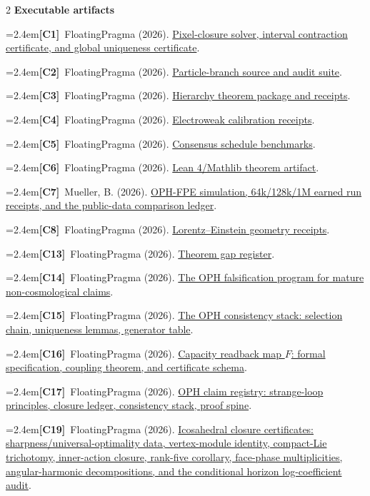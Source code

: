 \documentclass[10pt]{article}
\newcommand{\refentry}[2]{\par\noindent\hangindent=2.4em\hangafter=1\textbf{#1}\ #2}
\begin{document}
{\begin{multicols}{2}
\textbf{Executable artifacts}
\refentry{[C1]}{FloatingPragma (2026). \href{https://github.com/FloatingPragma/observer-patch-holography/tree/main/code/P_derivation}{Pixel-closure solver, interval contraction certificate, and global uniqueness certificate}.}
\refentry{[C2]}{FloatingPragma (2026). \href{https://github.com/FloatingPragma/observer-patch-holography/tree/main/code/particles}{Particle-branch source and audit suite}.}
\refentry{[C3]}{FloatingPragma (2026). \href{https://github.com/FloatingPragma/observer-patch-holography/tree/main/code/particles/hierarchy}{Hierarchy theorem package and receipts}.}
\refentry{[C4]}{FloatingPragma (2026). \href{https://github.com/FloatingPragma/observer-patch-holography/tree/main/code/particles/runs/calibration}{Electroweak calibration receipts}.}
\refentry{[C5]}{FloatingPragma (2026). \href{https://github.com/FloatingPragma/observer-patch-holography/tree/main/code/consensus}{Consensus schedule benchmarks}.}
\refentry{[C6]}{FloatingPragma (2026). \href{https://github.com/FloatingPragma/observer-patch-holography/tree/main/Lean}{Lean 4/Mathlib theorem artifact}.}
\refentry{[C7]}{Mueller, B. (2026).
\href{https://github.com/muellerberndt/oph-physics-sim}{OPH-FPE simulation,
64k/128k/1M earned run receipts, and the public-data comparison ledger}.}
\refentry{[C8]}{FloatingPragma (2026). \href{https://github.com/FloatingPragma/observer-patch-holography/tree/main/code/geometry}{Lorentz--Einstein geometry receipts}.}
\refentry{[C13]}{FloatingPragma (2026). \href{https://github.com/FloatingPragma/observer-patch-holography/blob/main/code/particles/THEOREM_GAP_REGISTER.md}{Theorem gap register}.}
\refentry{[C14]}{FloatingPragma (2026). \href{https://github.com/FloatingPragma/observer-patch-holography/blob/main/docs/OPH_FALSIFICATION_PROGRAM.md}{The OPH falsification program for mature non-cosmological claims}.}
\refentry{[C15]}{FloatingPragma (2026). \href{https://github.com/FloatingPragma/observer-patch-holography/blob/main/docs/CONSISTENCY_STACK.md}{The OPH consistency stack: selection chain, uniqueness lemmas, generator table}.}
\refentry{[C16]}{FloatingPragma (2026). \href{https://github.com/FloatingPragma/observer-patch-holography/tree/main/code/capacity_readback}{Capacity readback map \(F\): formal specification, coupling theorem, and certificate schema}.}
\refentry{[C17]}{FloatingPragma (2026). \href{https://github.com/FloatingPragma/observer-patch-holography/tree/main/docs}{OPH claim registry: strange-loop principles, closure ledger, consistency stack, proof spine}.}
\refentry{[C19]}{FloatingPragma (2026). \href{https://github.com/FloatingPragma/observer-patch-holography/tree/main/code/a5_closure}{Icosahedral closure certificates: sharpness/universal-optimality data, vertex-module identity, compact-Lie trichotomy, inner-action closure, rank-five corollary, face-phase multiplicities, angular-harmonic decompositions, and the conditional horizon log-coefficient audit}.}
\end{multicols}
}
\end{document}
